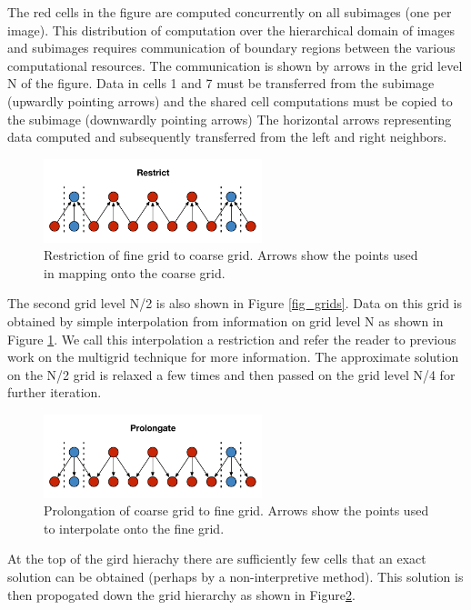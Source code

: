 The red cells in the figure are computed concurrently on all subimages (one per image).
This distribution of computation over the hierarchical domain of images and subimages
requires communication of boundary regions between the various computational resources.
The communication is shown by arrows in the grid level N of the figure.  Data in cells 1
and 7 must be transferred from the subimage (upwardly pointing arrows) and the shared cell
computations must be copied to the subimage (downwardly pointing arrows) The horizontal
arrows representing data computed and subsequently transferred from the left and right
neighbors.

\begin{figure}[!t]
\centering
\includegraphics[width=2.5in]{Fig2}
\caption{Restriction of fine grid to coarse grid. Arrows show the points used in
         mapping onto the coarse grid.}
\label{fig_restric}
\end{figure}

The second grid level N/2 is also shown in Figure \ref{fig_grids}.  Data on this grid is obtained
by simple interpolation from information on grid level N as shown in Figure \ref{fig_restric}.
We call this interpolation a restriction and refer the reader to previous work on the multigrid
technique for more information\cite{multigrid_methods}.  The approximate solution on the N/2
grid is relaxed a few times and then passed on the grid level N/4 for further iteration.

\begin{figure}[!t]
\centering
\includegraphics[width=2.5in]{Fig3}
\caption{Prolongation of coarse grid to fine grid. Arrows show the points used to
         interpolate onto the fine grid.}
\label{fig_prolongate}
\end{figure}

At the top of the gird hierachy there are sufficiently few cells that an exact solution can be
obtained (perhaps by a non-interpretive method).  This solution is then propogated down the
grid hierarchy as shown in Figure\ref{fig_prolongate}.

